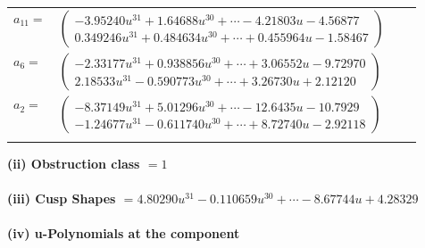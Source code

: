 \documentclass[1p]{elsarticle_modified}
\theoremstyle{definition}
\begin{document}
\begin{tabular}{m{7pt} m{180pt} m{7pt} m{180pt} }
\flushright $a_{11}=$&$\begin{pmatrix}-3.95240 u^{31}+1.64688 u^{30}+\cdots-4.21803 u-4.56877\\0.349246 u^{31}+0.484634 u^{30}+\cdots+0.455964 u-1.58467\end{pmatrix}$ \\
\flushright $a_{6}=$&$\begin{pmatrix}-2.33177 u^{31}+0.938856 u^{30}+\cdots+3.06552 u-9.72970\\2.18533 u^{31}-0.590773 u^{30}+\cdots+3.26730 u+2.12120\end{pmatrix}$ \\
\flushright $a_{2}=$&$\begin{pmatrix}-8.37149 u^{31}+5.01296 u^{30}+\cdots-12.6435 u-10.7929\\-1.24677 u^{31}-0.611740 u^{30}+\cdots+8.72740 u-2.92118\end{pmatrix}$\\&\end{tabular}
\flushleft \textbf{(ii) Obstruction class $= 1$}\\~\\
\flushleft \textbf{(iii) Cusp Shapes $= 4.80290 u^{31}-0.110659 u^{30}+\cdots-8.67744 u+4.28329$}\\~\\
\newpage\renewcommand{\arraystretch}{1}
\flushleft \textbf{(iv) u-Polynomials at the component}\newline \\
\end{document}
